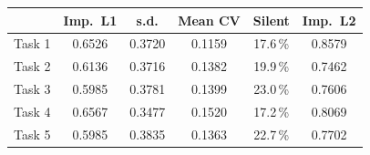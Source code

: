 \begin{tabular}{@{}lccccc@{}}
\toprule
& \textbf{Imp.\ L1} & \textbf{s.d.} & \textbf{Mean CV} & \textbf{Silent} & \textbf{Imp.\ L2} \\
\midrule
Task 1 & 0.6526 & 0.3720 & 0.1159 & 17.6\,\% & 0.8579 \\
Task 2 & 0.6136 & 0.3716 & 0.1382 & 19.9\,\% & 0.7462 \\
Task 3 & 0.5985 & 0.3781 & 0.1399 & 23.0\,\% & 0.7606 \\
Task 4 & 0.6567 & 0.3477 & 0.1520 & 17.2\,\% & 0.8069 \\
Task 5 & 0.5985 & 0.3835 & 0.1363 & 22.7\,\% & 0.7702 \\
\bottomrule
\end{tabular}
